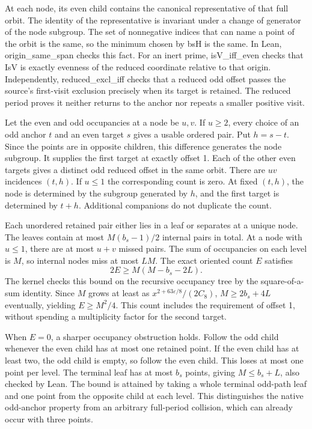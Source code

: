 \documentclass[12pt,letterpaper]{article}
\DeclareRobustCommand{\id}[1]{\mbox{\small\ttfamily #1}}
\begin{document}
At each node, its even child contains the canonical representative of that full orbit. The identity of the representative is invariant under a change of generator of the node subgroup. The set of nonnegative indices that can name a point of the orbit is the same, so the minimum chosen by \id{bsH} is the same. In Lean, \id{origin\_same\_span} checks this fact. For an inert prime, \id{isV\_iff\_even} checks that \id{IsV} is exactly evenness of the reduced coordinate relative to that origin. Independently, \id{reduced\_excl\_iff} checks that a reduced odd offset passes the source's first-visit exclusion precisely when its target is retained. The reduced period proves it neither returns to the anchor nor repeats a smaller positive visit.

Let the even and odd occupancies at a node be \(u,v\). If \(u\ge2\), every choice of an odd anchor \(t\) and an even target \(s\) gives a usable ordered pair. Put \(h=s-t\). Since the points are in opposite children, this difference generates the node subgroup. It supplies the first target at exactly offset 1. Each of the other even targets gives a distinct odd reduced offset in the same orbit. There are \(uv\) incidences \((t,h)\). If \(u\le1\) the corresponding count is zero. At fixed \((t,h)\), the node is determined by the subgroup generated by \(h\), and the first target is determined by \(t+h\). Additional companions do not duplicate the count.

Each unordered retained pair either lies in a leaf or separates at a unique node. The leaves contain at most \(M(b_s-1)/2\) internal pairs in total. At a node with \(u\le1\), there are at most \(u+v\) missed pairs. The sum of occupancies on each level is \(M\), so internal nodes miss at most \(LM\). The exact oriented count \(E\) satisfies
\begin{equation}
                 2E\ge M(M-b_s-2L).
                 \label{eq:gain-oriented}
\end{equation}
The kernel checks this bound on the recursive occupancy tree by the square-of-a-sum identity. Since \(M\) grows at least as \(x^{2+63\varepsilon/8}/(2C_8)\), \(M\ge 2b_s+4L\) eventually, yielding \(E\ge M^2/4\). This count includes the requirement of offset 1, without spending a multiplicity factor for the second target.

When \(E=0\), a sharper occupancy obstruction holds. Follow the odd child whenever the even child has at most one retained point. If the even child has at least two, the odd child is empty, so follow the even child. This loses at most one point per level. The terminal leaf has at most \(b_s\) points, giving \(M\le b_s+L\), also checked by Lean. The bound is attained by taking a whole terminal odd-path leaf and one point from the opposite child at each level. This distinguishes the native odd-anchor property from an arbitrary full-period collision, which can already occur with three points.
\end{document}
